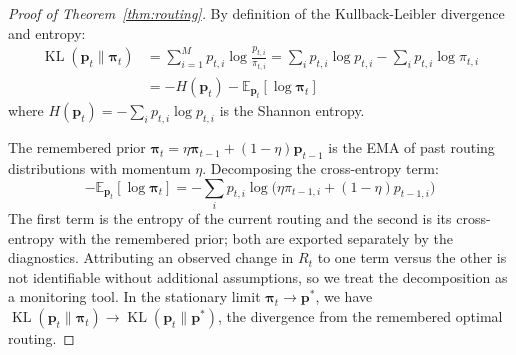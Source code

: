 \documentclass[11pt,a4paper]{article}
\theoremstyle{definition}
\DeclareMathOperator{\KL}{KL}
\begin{document}
\begin{proof}[Proof of Theorem~\ref{thm:routing}]
By definition of the Kullback-Leibler divergence and entropy:
\begin{align}
\KL(\mathbf{p}_t \| \boldsymbol{\pi}_t) &= \sum_{i=1}^M p_{t,i} \log\frac{p_{t,i}}{\pi_{t,i}} = \sum_i p_{t,i} \log p_{t,i} - \sum_i p_{t,i} \log \pi_{t,i} \\
&= -H(\mathbf{p}_t) - \mathbb{E}_{\mathbf{p}_t}[\log \boldsymbol{\pi}_t]
\end{align}
where $H(\mathbf{p}_t) = -\sum_i p_{t,i} \log p_{t,i}$ is the Shannon entropy.

The remembered prior $\boldsymbol{\pi}_t = \eta \boldsymbol{\pi}_{t-1} + (1-\eta) \mathbf{p}_{t-1}$ is the EMA of past routing distributions with momentum $\eta$. Decomposing the cross-entropy term:
\begin{equation}
-\mathbb{E}_{\mathbf{p}_t}[\log \boldsymbol{\pi}_t] = -\sum_i p_{t,i} \log\!\big(\eta \pi_{t-1,i} + (1-\eta) p_{t-1,i}\big)
\end{equation}
The first term is the entropy of the current routing and the second is its cross-entropy with the remembered prior; both are exported separately by the diagnostics. Attributing an observed change in $R_t$ to one term versus the other is not identifiable without additional assumptions, so we treat the decomposition as a monitoring tool. In the stationary limit $\boldsymbol{\pi}_t \to \mathbf{p}^*$, we have $\KL(\mathbf{p}_t \| \boldsymbol{\pi}_t) \to \KL(\mathbf{p}_t \| \mathbf{p}^*)$, the divergence from the remembered optimal routing.
\end{proof}
\end{document}
